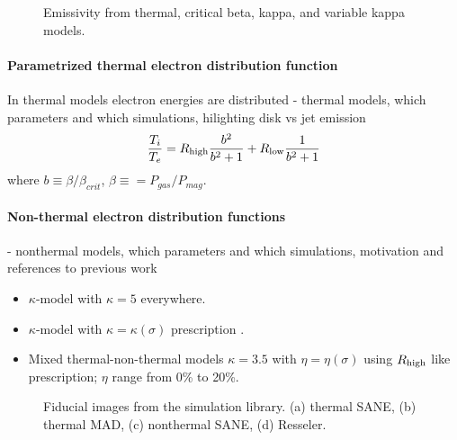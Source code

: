 \begin{figure*}
  \caption{Emissivity from thermal, critical beta, kappa, and variable
    kappa models.}
  \label{fig:jnu}
\end{figure*}

\paragraph{Parametrized thermal electron distribution function}
In thermal models electron energies are distributed
- thermal models, which parameters and which simulations, hilighting disk vs jet emission
\begin{equation}
\frac{T_i}{T_e} = R_{\rm high} \frac{b^2}{b^2+1} + R_{\rm low} \frac{1}{b^2+1}
\end{equation}
where $b\equiv\beta/\beta_{crit}$, $\beta\equiv=P_{gas}/P_{mag}$.


\paragraph{Non-thermal electron distribution functions}
- nonthermal models, which parameters and which simulations, motivation and references to previous work

\begin{itemize}
\item $\kappa$-model with $\kappa = 5$ everywhere.
\item $\kappa$-model with $\kappa = \kappa(\sigma)$ prescription
  \citep{2016ApJ...826...77B}.
\item Mixed thermal-non-thermal models $\kappa = 3.5$ with $\eta =
  \eta(\sigma)$ using $R_\mathrm{high}$ like prescription; $\eta$ range from 0\%
  to 20\%.
\end{itemize}


\begin{figure*}
  \caption{Fiducial images from the simulation library.
    (a) thermal SANE, (b) thermal MAD, (c) nonthermal SANE, (d)
    Resseler.
    }
  \label{fig:fiducial_imgs}
\end{figure*}

